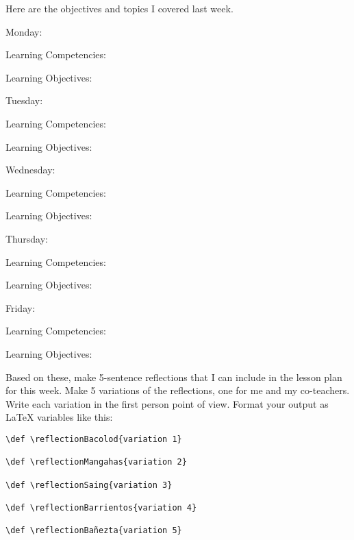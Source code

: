 \documentclass[11pt]{article}
\begin{document}
Here are the objectives and topics I covered last week. 

\vspace*{1em} 
Monday:

Learning Competencies: \learningCompetenciesOne

Learning Objectives: \learningObjectivesOne

\vspace*{1em} 
Tuesday:

Learning Competencies: \learningCompetenciesTwo

Learning Objectives: \learningObjectivesTwo

\vspace*{1em} 
Wednesday:

Learning Competencies: \learningCompetenciesThree

Learning Objectives: \learningObjectivesThree

\vspace*{1em} 
Thursday:

Learning Competencies: \learningCompetenciesFour

Learning Objectives: \learningObjectivesFour

\vspace*{1em} 
Friday:

Learning Competencies: \learningCompetenciesFive

Learning Objectives: \learningObjectivesFive

Based on these, make 5-sentence reflections that I can include in the lesson plan for this week. Make 5 variations of the reflections, one for me and my co-teachers. Write each variation in the first person point of view. Format your output as LaTeX variables like this:

\begin{verbatim}
\def \reflectionBacolod{variation 1}

\def \reflectionMangahas{variation 2}

\def \reflectionSaing{variation 3}

\def \reflectionBarrientos{variation 4}

\def \reflectionBañezta{variation 5}
\end{verbatim}
\end{document}

